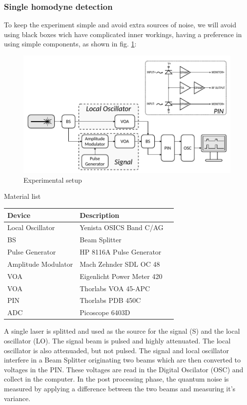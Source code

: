 \begin{bibunit}[plain]
\subsubsection{Single homodyne detection}
%
To keep the experiment simple and avoid extra sources of noise, we will avoid using black boxes wich have complicated inner workings, having a preference in using simple components, as shown in fig. \ref{fig:experimental_homodyne_setup}:
\\
\begin{figure}[H]
	\centering
	\includegraphics{./sdf/optical_detection/figures/scheme_experimental.pdf}
	\caption{Experimental setup}
	\label{fig:experimental_homodyne_setup}
\end{figure}
%
%
Material list
\begin{table}[H]
	\centering
	\begin{tabulary}{1.0\textwidth}{|L|L|l|}
		\hline
		\textbf{Device}		& \textbf{Description}\\
		\hline
		Local Oscillator	& Yenista OSICS Band C/AG\\
		\hline
		BS					& Beam Splitter\\
		\hline
		Pulse Generator		& HP 8116A Pulse Generator\\
		\hline
		Amplitude Modulator	& Mach Zehnder SDL OC 48\\
		\hline
		VOA					& Eigenlicht Power Meter 420\\
		\hline
		VOA					& Thorlabs VOA 45-APC\\
		\hline
		PIN					& Thorlabs PDB 450C\\
		\hline
		ADC					& Picoscope 6403D\\
		\hline
	\end{tabulary}
\end{table}
%
A single laser is splitted and used as the source for the signal (S) and the local oscillator (LO). The signal beam is pulsed and highly attenuated. The local oscillator is also attenuaded, but not pulsed. The signal and local oscillator interfere in a Beam Splitter originating two beams which are then converted to voltages in the PIN. These voltages are read in the Digital Oscilator (OSC) and collect in the computer. In the post processing phase, the quantum noise is measured by applying a difference between the two beams and measuring it's variance.

\end{bibunit}
